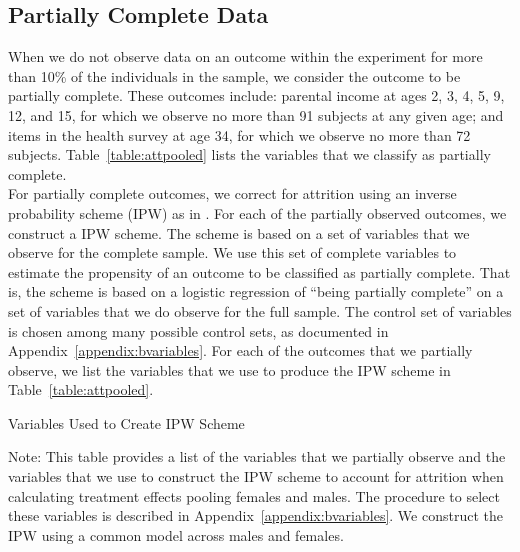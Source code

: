 \subsection{Partially Complete Data}
\label{app:method_partialobs}

When we do not observe data on an outcome within the experiment for more than 10\% of the individuals in the sample, we consider the outcome to be partially complete. These outcomes include: parental income at ages 2, 3, 4, 5, 9, 12, and 15, for which we observe no more than 91 subjects at any given age; and items in the health survey at age 34, for which we observe no more than 72 subjects. Table~\ref{table:attpooled} lists the variables that we classify as partially complete.\\

\noindent For partially complete outcomes, we correct for attrition using an inverse probability scheme (IPW) as in  \citet{Horvitz_Thompson_1952_JASA}. For each of the partially observed outcomes, we construct a IPW scheme. The scheme is based on a set of variables that we observe for the complete sample. We use this set of complete variables to estimate the propensity of an outcome to be classified as partially complete. That is, the scheme is based on a logistic regression of ``being partially complete'' on a set of variables that we do observe for the full sample. The control set of variables is chosen among many possible control sets,  as documented in Appendix~\ref{appendix:bvariables}. For each of the outcomes that we partially observe, we list the variables that we use to produce the IPW scheme in Table~\ref{table:attpooled}.

\begin{table}
\begin{threeparttable}
\caption{Variables Used to Create IPW Scheme}
\label{table:attpooled}
\centering

\begin{tablenotes}
\footnotesize
\item Note: This table provides a list of the variables that we partially observe and the variables that we use to construct the IPW scheme to account for attrition when calculating treatment effects pooling females and males. The procedure to select these variables is described in Appendix~\ref{appendix:bvariables}. We construct the IPW using a common model across males and females.
\end{tablenotes}
\end{threeparttable}
\end{table}
\restoregeometry
\doublespacing 

